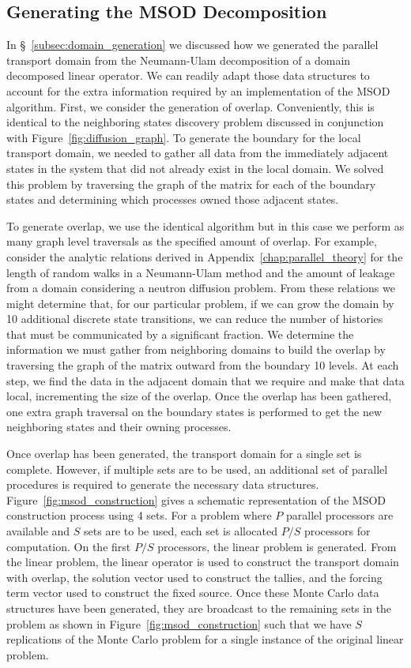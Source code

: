 \subsection{Generating the MSOD Decomposition }
\label{subsec:msod_generation}
In \S~\ref{subsec:domain_generation} we discussed how we generated the
parallel transport domain from the Neumann-Ulam decomposition of a
domain decomposed linear operator. We can readily adapt those data
structures to account for the extra information required by an
implementation of the MSOD algorithm. First, we consider the
generation of overlap. Conveniently, this is identical to the
neighboring states discovery problem discussed in conjunction with
Figure~\ref{fig:diffusion_graph}. To generate the boundary for the
local transport domain, we needed to gather all data from the
immediately adjacent states in the system that did not already exist
in the local domain. We solved this problem by traversing the graph
of the matrix for each of the boundary states and determining which
processes owned those adjacent states. 

To generate overlap, we use the identical algorithm but in this case
we perform as many graph level traversals as the specified amount of
overlap. For example, consider the analytic relations derived in
Appendix~\ref{chap:parallel_theory} for the length of random walks in a
Neumann-Ulam method and the amount of leakage from a domain
considering a neutron diffusion problem. From these relations we might
determine that, for our particular problem, if we can grow the domain
by 10 additional discrete state transitions, we can reduce the number
of histories that must be communicated by a significant fraction. We
determine the information we must gather from neighboring domains to
build the overlap by traversing the graph of the matrix outward from
the boundary 10 levels. At each step, we find the data in the adjacent
domain that we require and make that data local, incrementing the size
of the overlap. Once the overlap has been gathered, one extra graph
traversal on the boundary states is performed to get the new
neighboring states and their owning processes.

Once overlap has been generated, the transport domain for a single set
is complete. However, if multiple sets are to be used, an additional
set of parallel procedures is required to generate the necessary data
structures. Figure~\ref{fig:msod_construction} gives a schematic
representation of the MSOD construction process using 4 sets. For a
problem where $P$ parallel processors are available and $S$ sets are
to be used, each set is allocated $P/S$ processors for computation. On
the first $P/S$ processors, the linear problem is generated. From the
linear problem, the linear operator is used to construct the transport
domain with overlap, the solution vector used to construct the
tallies, and the forcing term vector used to construct the fixed
source. Once these Monte Carlo data structures have been generated,
they are broadcast to the remaining sets in the problem as shown in
Figure~\ref{fig:msod_construction} such that we have $S$ replications
of the Monte Carlo problem for a single instance of the original
linear problem.


